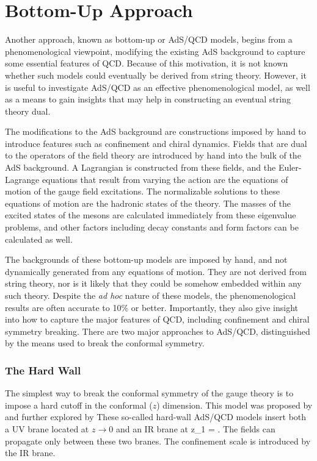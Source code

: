 \section{Bottom-Up Approach}

Another approach, known as bottom-up or AdS/QCD models, begins from a phenomenological viewpoint, modifying the existing AdS background to capture some essential features of QCD.
Because of this motivation, it is not known whether such models could eventually be derived from string theory.
However, it is useful to investigate AdS/QCD as an effective phenomenological model, as well as a means to gain insights that may help in constructing an eventual string theory dual.
 
The modifications to the AdS background are constructions imposed by hand to introduce features such as confinement and chiral dynamics.
Fields that are dual to the operators of the field theory are introduced by hand into the bulk of the AdS background.
A Lagrangian is constructed from these fields, and the Euler-Lagrange equations that result from varying the action are the equations of motion of the gauge field excitations.
The normalizable solutions to these equations of motion are the hadronic states of the theory.
The masses of the excited states of the mesons are calculated immediately from these eigenvalue problems, and other factors including decay constants and form factors can be calculated as well.

The backgrounds of these bottom-up models are imposed by hand, and not dynamically generated from any equations of motion.
They are not derived from string theory, nor is it likely that they could be somehow embedded within any such theory.
Despite the \emph{ad hoc} nature of these models, the phenomenological results are often accurate to 10\% or better.
Importantly, they also give insight into how to capture the major features of QCD, including confinement and chiral symmetry breaking.
There are two major approaches to AdS/QCD, distinguished by the means used to break the conformal symmetry.

\subsubsection{The Hard Wall}
The simplest way to break the conformal symmetry of the gauge theory is to impose a hard cutoff in the conformal ($z$) dimension.
This model was proposed by \cite{stephanov-katz-son} and further explored by \cite{DaRold:2005zs,DaRold:2005vr}
These so-called hard-wall AdS/QCD models insert both a UV brane located at $z\rightarrow 0$ and an IR brane at 
\be
z_1 = .
\ee
The fields can propagate only between these two branes.
The confinement scale is introduced by the IR brane.

